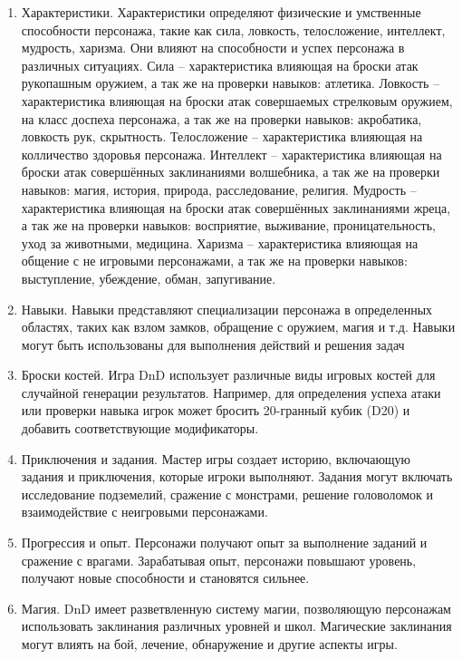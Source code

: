 \begin{enumerate}
		\item Характеристики.
			Характеристики определяют физические и умственные способности персонажа, такие как сила, ловкость, телосложение, интеллект, мудрость, харизма. Они влияют на способности и успех персонажа в различных ситуациях.
			Сила -- характеристика влияющая на броски атак рукопашным оружием, а так же на проверки навыков: атлетика.
			 Ловкость -- характеристика влияющая на броски атак совершаемых стрелковым оружием, на класс доспеха персонажа, а так же на проверки навыков: акробатика, ловкость рук, скрытность.
			Телосложение -- характеристика влияющая на колличество здоровья персонажа.
			Интеллект -- характеристика влияющая на броски атак совершённых заклинаниями волшебника, а так же на проверки навыков: магия, история, природа, расследование, религия.
			 Мудрость -- характеристика влияющая на броски атак  совершённых заклинаниями жреца, а так же на проверки навыков: восприятие, выживание, проницательность, уход за животными, медицина.
			 Харизма -- характеристика влияющая на общение с не игровыми персонажами, а так же на проверки навыков: выступление, убеждение, обман, запугивание.
		\item Навыки. Навыки представляют специализации персонажа в определенных областях, таких как взлом замков, обращение с оружием, магия и т.д. Навыки могут быть использованы для выполнения действий и решения задач
		\item Броски костей.
			 Игра DnD использует различные виды игровых костей для случайной генерации результатов. Например, для определения успеха атаки или проверки навыка игрок может бросить 20-гранный кубик (D20) и добавить соответствующие модификаторы.
		\item Приключения и задания.
			 Мастер игры создает историю, включающую задания и приключения, которые игроки выполняют. Задания могут включать исследование подземелий, сражение с монстрами, решение головоломок и взаимодействие с неигровыми персонажами.
		\item Прогрессия и опыт.
			Персонажи получают опыт за выполнение заданий и сражение с врагами. Зарабатывая опыт, персонажи повышают уровень, получают новые способности и становятся сильнее.
		\item Магия.
			DnD имеет разветвленную систему магии, позволяющую персонажам использовать заклинания различных уровней и школ. Магические заклинания могут влиять на бой, лечение, обнаружение и другие аспекты игры.
	\end{enumerate}
